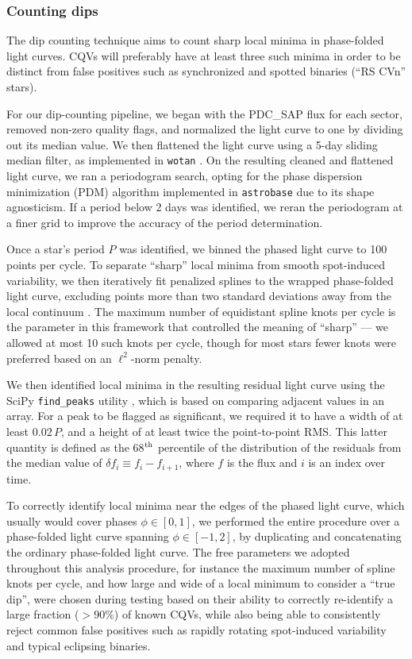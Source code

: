\documentclass[11pt,twocolumn,tighten]{aastex63}
\begin{document}
\subsubsection{Counting dips}
\label{subsec:counting}

The dip counting technique aims to count sharp local minima in
phase-folded light curves.  CQVs will preferably have at least three
such minima in order to be distinct from false positives such as
synchronized and spotted binaries (``RS CVn'' stars). 

For our dip-counting pipeline, we began with the PDC\_SAP flux for
each sector, removed non-zero quality flags, and normalized the light
curve to one by dividing out its median value.  We then flattened the
light curve using a 5-day sliding median filter, as implemented in
\texttt{wotan} \citep{2019AJ....158..143H}.  On the resulting cleaned
and flattened light curve, we ran a periodogram search, opting for the
\citet{1978ApJ...224..953S} phase dispersion minimization (PDM)
algorithm implemented in \texttt{astrobase}
\citep{2021zndo...1011188B} due to its shape agnosticism.  If a period
below 2 days was identified, we reran the periodogram at a finer grid
to improve the accuracy of the period determination.

Once a star's period $P$ was identified, we binned the phased light
curve to 100 points per cycle.  To separate ``sharp'' local minima
from smooth spot-induced variability, we then iteratively fit
penalized splines to the wrapped phase-folded light curve, excluding
points more than two standard deviations away from the local continuum
\citep{2019AJ....158..143H}.  The maximum number of equidistant spline
knots per cycle is the parameter in this framework that controlled the
meaning of ``sharp'' --- we allowed at most 10 such knots per cycle,
though for most stars fewer knots were preferred based on an
$\ell^2$-norm penalty. 

We then identified local minima in the resulting residual light curve
using the SciPy \texttt{find\_peaks} utility
\citep{2020NatMe..17..261V}, which is based on comparing adjacent
values in an array.  For a peak to be flagged as significant, we
required it to have a width of at least $0.02\,P$, and a height of at
least twice the point-to-point RMS.  This latter quantity is defined
as the 68$^{\rm th}$ percentile of the distribution of the residuals
from the median value of $\delta f_i \equiv f_i - f_{i+1}$, where $f$
is the flux and $i$ is an index over time.

To correctly identify local minima near the edges of the phased light
curve, which usually would cover phases $\phi \in [ 0,1 ]$, we 
performed the entire procedure over a phase-folded light curve
spanning $\phi \in [-1,2 ]$, by duplicating and concatenating the
ordinary phase-folded light curve.  The free parameters we adopted
throughout this analysis procedure, for instance the maximum number of
spline knots per cycle, and how large and wide of a local minimum to
consider a ``true dip'', were chosen during testing based on
their ability to correctly re-identify a large fraction ($>$90\%) of
known CQVs, while also being able to consistently reject common false
positives such as rapidly rotating spot-induced variability and
typical eclipsing binaries.
\end{document}
